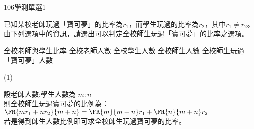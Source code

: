 \begin{QUESTIONS}
    \begin{QUESTION}
        \begin{ExamInfo}{106}{學測}{單選}{1}
        \end{ExamInfo}
        \begin{ExamAnsRateInfo}{53}{82}{52}{25}
        \end{ExamAnsRateInfo}
        \begin{QBODY}
            已知某校老師玩過「寶可夢」的比率為${{r}_{1}}$，而學生玩過的比率為${{r}_{2}}$，其中${{r}_{1}}\ne {{r}_{2}}$。
            由下列選項中的資訊，請選出可以判定全校師生玩過「寶可夢」的比率之選項。
            \begin{QOPS}
                \QOP 全校老師與學生比率     
                \QOP 全校老師人數
                \QOP 全校學生人數
                \QOP 全校師生人數
                \QOP 全校師生玩過「寶可夢」人數
            \end{QOPS}
        \end{QBODY}
        \begin{QFROMS}
        \end{QFROMS}
        \begin{QTAGS}\end{QTAGS}
        \begin{QANS}
            (1)
        \end{QANS}
        \begin{QSOLLIST}
            \begin{QSOL}[SOLID=21]
                設老師人數:學生人數為 $m:n$\\
                則全校師生玩過寶可夢的比例為：$\FR{m r_1 + n r_2}{m+n} = \FR{m}{m+n} r_1 +\FR{n}{m+n} r_2$\\
                若是得到師生人數比例即可求全校師生玩過寶可夢的比率。
            \end{QSOL}


\end{QSOLLIST}
\end{QUESTION}
\end{QUESTIONS}
